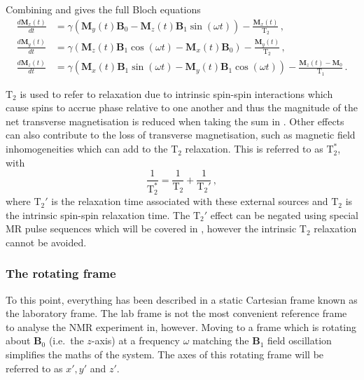 Combining  and  gives the full Bloch equations
\begin{align}
	\frac{d\mathbf{M}_x(t)}{dt} &= \gamma\left(\mathbf{M}_y(t)\mathbf{B}_0 - \mathbf{M}_z(t)\mathbf{B}_1\sin(\omega t)\right) - \frac{\mathbf{M}_x(t)}{\mathrm{T}_2}\,,\label{eq:bloch_labx}\\
	\frac{d\mathbf{M}_y(t)}{dt} &= \gamma\left(\mathbf{M}_z(t)\mathbf{B}_1\cos(\omega t) - \mathbf{M}_x(t)\mathbf{B}_0\right) - \frac{\mathbf{M}_y(t)}{\mathrm{T}_2}\,,\label{eq:bloch_laby}\\
	\frac{d\mathbf{M}_z(t)}{dt} &= \gamma \left(\mathbf{M}_x(t)\mathbf{B}_1\sin(\omega t) - \mathbf{M}_y(t)\mathbf{B}_1\cos(\omega t) \right) - \frac{\mathbf{M}_z(t) - \mathbf{M}_0}{\mathrm{T}_1}\,. \label{eq:bloch_labz}
\end{align}

$\mathrm{T}_2$ is used to refer to relaxation due to intrinsic spin-spin interactions which cause spins to accrue phase relative to one another and thus the magnitude of the net transverse magnetisation is reduced when taking the sum in  .
Other effects can also contribute to the loss of transverse magnetisation, such as magnetic field inhomogeneities which can add to the $\mathrm{T}_2$ relaxation.
This is referred to as $\mathrm{T}_2^*$, with
\begin{equation}
  \frac{1}{\mathrm{T}_2^*} = \frac{1}{\mathrm{T}_2} + \frac{1}{\mathrm{T}_2'}\,,
  \label{eq:t2star}
\end{equation}
where $\mathrm{T}_2'$ is the relaxation time associated with these external sources and $\mathrm{T}_2$ is the intrinsic spin-spin relaxation time. The $\mathrm{T}_2'$ effect can be negated using special MR pulse sequences which will be covered in , however the intrinsic $\mathrm{T}_2$ relaxation cannot be avoided.  


\subsubsection{The rotating frame}
To this point, everything has been described in a static Cartesian frame known as the laboratory frame. 
The lab frame is not the most convenient reference frame to analyse the \ac{NMR} experiment in, however.
Moving to a frame which is rotating about $\mathbf{B}_0$ (i.e.\ the $z$-axis) at a frequency $\omega$ matching the $\mathbf{B}_1$ field oscillation simplifies the maths of the system. 
The axes of this rotating frame will be referred to as $x', y'$ and $z'$. 

